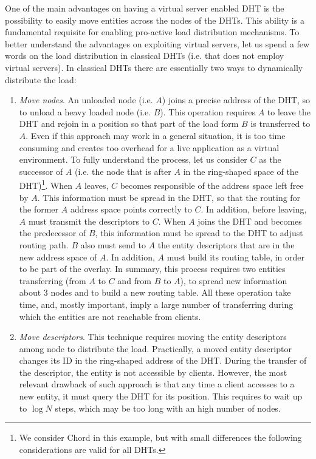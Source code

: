 \documentclass[final,10pt,a5paper]{phdimt}
\theoremstyle{definition}
\begin{document}
One of the main advantages on having a virtual server enabled DHT is the possibility to easily move entities across the nodes of the DHTs.
This ability is a fundamental requisite for enabling pro-active load distribution mechanisms.
To better understand the advantages on exploiting virtual servers, let us spend a few words on the load distribution in classical DHTs (i.e. that does not employ virtual servers).
In classical DHTs there are essentially two ways to dynamically distribute the load:

\begin{enumerate}
\item \textit{Move nodes}. An unloaded node (i.e. $A$) joins a precise address of the DHT, so to unload a heavy loaded node (i.e. $B$). This operation requires $A$ to leave the DHT and rejoin in a position so that part of the load form $B$ is transferred to $A$. Even if this approach may work in a general situation, it is too time consuming and creates too overhead for a live application as a virtual environment. To fully understand the process, let us consider $C$ as the successor of $A$ (i.e. the node that is after $A$ in the ring-shaped space of the DHT)\footnote{We consider Chord in this example, but with small differences the following considerations are valid for all DHTs.}. When $A$ leaves, $C$ becomes responsible of the address space left free by $A$. This information must be spread in the DHT, so that the routing for the former $A$ address space points correctly to $C$. 
In addition, before leaving, $A$ must transmit the descriptors to $C$.
When $A$ joins the DHT and becomes the predecessor of $B$, this information must be spread to the DHT to adjust routing path. $B$ also must send to $A$ the entity descriptors that are in the new address space of $A$. In addition, $A$ must build its routing table, in order to be part of the overlay.
In summary, this process requires two entities transferring (from $A$ to $C$ and from $B$ to $A$), to spread new information about 3 nodes and to build a new routing table.
All these operation take time, and, mostly important, imply a large number of transferring during which the entities are not reachable from clients.

\item \textit{Move descriptors}. This technique requires moving the entity descriptors among node to distribute the load. Practically, a moved entity descriptor changes its ID in the ring-shaped address of the DHT. During the transfer of the descriptor, the entity is not accessible by clients. However, the most relevant drawback of such approach is that any time a client accesses to a new entity, it must query the DHT for its position. This requires to wait up to $\log N$ steps, which may be too long with an high number of nodes.


\end{enumerate}
\end{document}
